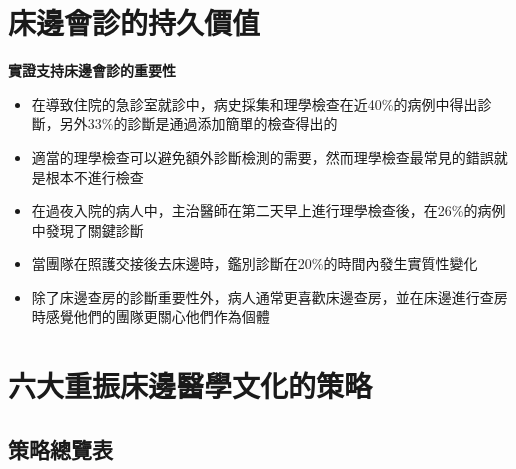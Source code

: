 \documentclass[12pt,a4paper]{article}
\begin{document}
\section{床邊會診的持久價值}

\begin{importantbox}
\textbf{實證支持床邊會診的重要性}

\begin{itemize}
\item 在導致住院的急診室就診中，病史採集和理學檢查在近40\%的病例中得出診斷，另外33\%的診斷是通過添加簡單的檢查得出的
\item 適當的理學檢查可以避免額外診斷檢測的需要，然而理學檢查最常見的錯誤就是根本不進行檢查
\item 在過夜入院的病人中，主治醫師在第二天早上進行理學檢查後，在26\%的病例中發現了關鍵診斷
\item 當團隊在照護交接後去床邊時，鑑別診斷在20\%的時間內發生實質性變化
\item 除了床邊查房的診斷重要性外，病人通常更喜歡床邊查房，並在床邊進行查房時感覺他們的團隊更關心他們作為個體
\end{itemize}
\end{importantbox}

\section{六大重振床邊醫學文化的策略}

\subsection{策略總覽表}
\end{document}
